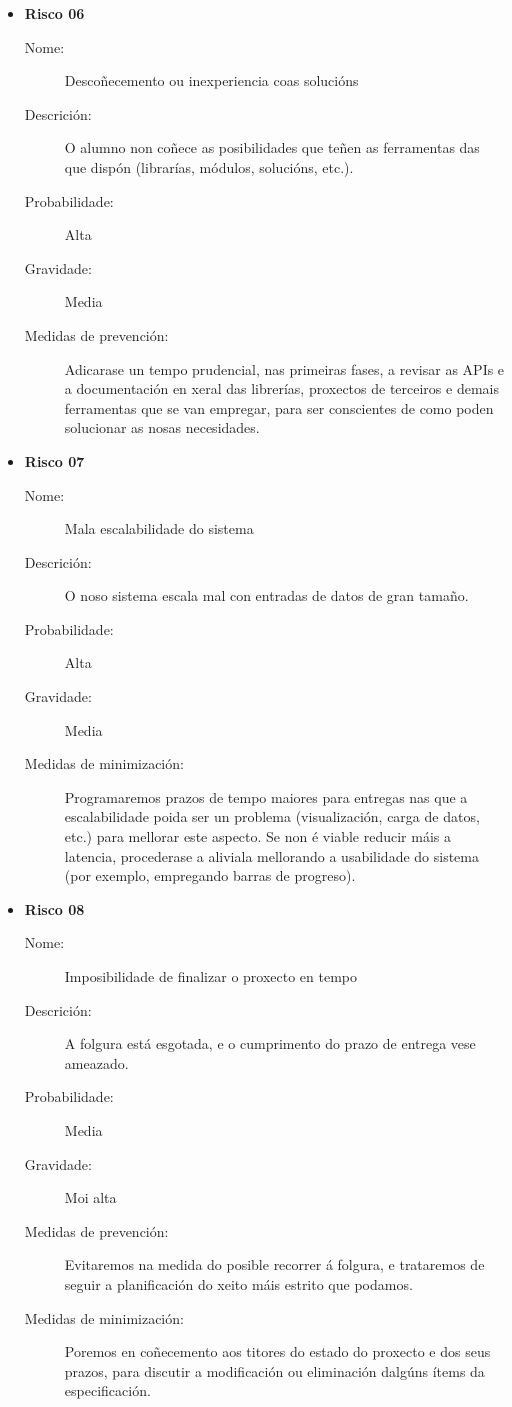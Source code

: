 \begin{itemize}
\item \textbf{Risco 06}
\begin{description}
\item[Nome:] Descoñecemento ou inexperiencia coas solucións
\item[Descrición:] O alumno non coñece as posibilidades que teñen as ferramentas das que dispón (librarías, módulos, solucións, etc.).
\item[Probabilidade:] Alta
\item[Gravidade:] Media
\item[Medidas de prevención:] Adicarase un tempo prudencial, nas primeiras fases, a revisar as APIs e a documentación en xeral das librerías, proxectos de terceiros e demais ferramentas que se van empregar, para ser conscientes de como poden solucionar as nosas necesidades.
\end{description}

\item \textbf{Risco 07}
\begin{description}
\item[Nome:] Mala escalabilidade do sistema
\item[Descrición:] O noso sistema escala mal con entradas de datos de gran tamaño.
\item[Probabilidade:] Alta
\item[Gravidade:] Media
\item[Medidas de minimización:] Programaremos prazos de tempo maiores para entregas nas que a escalabilidade poida ser un problema (visualización, carga de datos, etc.) para mellorar este aspecto. Se non é viable reducir máis a latencia, procederase a aliviala mellorando a usabilidade do sistema (por exemplo, empregando barras de progreso).
\end{description}

\item \textbf{Risco 08}
\begin{description}
\item[Nome:] Imposibilidade de finalizar o proxecto en tempo
\item[Descrición:] A folgura está esgotada, e o cumprimento do prazo de entrega vese ameazado.
\item[Probabilidade:] Media
\item[Gravidade:] Moi alta
\item[Medidas de prevención:] Evitaremos na medida do posible recorrer á folgura, e trataremos de seguir a planificación do xeito máis estrito que podamos.
\item[Medidas de minimización:] Poremos en coñecemento aos titores do estado do proxecto e dos seus prazos, para discutir a modificación ou eliminación dalgúns ítems da especificación.
\end{description}

\end{itemize}

